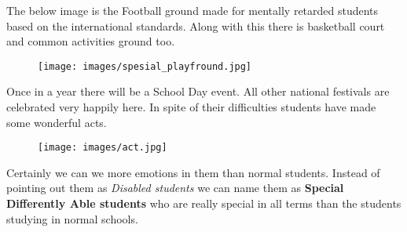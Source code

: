 The below image is the Football ground made for mentally retarded students based on the international standards. Along with this there is basketball court and common activities ground too. 
\begin{figure}[H]
    \centering
    \texttt{[image: images/spesial\_playfround.jpg]}
\end{figure}

Once in a year there will be a School Day event. All other national festivals are celebrated very happily here. In spite of their difficulties students have made some wonderful acts. 

\begin{figure}[H]
    \centering
    \texttt{[image: images/act.jpg]}
\end{figure}

Certainly we can we more emotions in them than normal students. Instead of pointing out them as \textit{Disabled students} we can name them as \textbf{Special Differently Able students} who are really special in all terms than the students studying in normal schools.